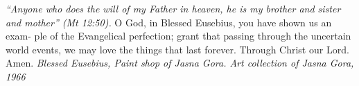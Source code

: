 \pagestyle{empty}
\hspace{0pt}
\vfill

\textit{``Anyone who does the will of my Father in heaven, he is
my brother and sister and mother'' (Mt 12:50).}
\vspace{1em}
O God, in Blessed Eusebius, you have shown us an exam-
ple of the Evangelical perfection; grant that passing through the
uncertain world events, we may love the things that last forever.
Through Christ our Lord. Amen.
\vfill
\textit{Blessed Eusebius, Paint shop of Jasna Gora.
Art collection of Jasna Gora, 1966}
\hspace{0pt}
\newpage
